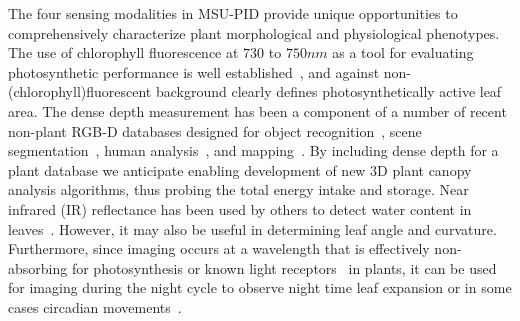 
The four sensing modalities in MSU-PID provide unique opportunities to comprehensively characterize plant morphological and physiological phenotypes. The use of chlorophyll fluorescence at $730$ to $750nm$ as a tool for evaluating photosynthetic performance is well established~\cite{baker2008chlorophyll}, and against non-(chlorophyll)fluorescent background clearly defines photosynthetically active leaf area.
The dense depth measurement has been a component of a number of recent non-plant RGB-D databases designed for object recognition~\cite{Lai2011}, scene segmentation~\cite{Silberman2011}, human analysis~\cite{Sung2011,Barbosa:reid12}, and mapping~\cite{sturm12iros}. By including dense depth for a plant database we anticipate enabling development of new 3D plant canopy analysis algorithms, thus probing the total energy intake and storage.
Near infrared (IR) reflectance has been used by others to detect water content in leaves~\cite{chen2014dissecting}.  However, it may also be useful in determining leaf angle and curvature.  Furthermore, since imaging occurs at a wavelength that is effectively non-absorbing for photosynthesis or known light receptors~\cite{butler1964actton,eskins1992light} in plants, it can be used for imaging during the night cycle to observe night time leaf expansion or in some cases circadian movements~\cite{mcclung2006plant}.






